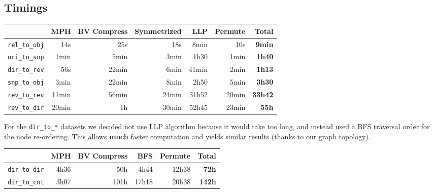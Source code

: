 \documentclass[11pt,a4paper]{article}
\begin{document}

\subsection{Timings}

\begin{center}
    \begin{tabular}{@{} l *6r @{}}
        \toprule
        \multicolumn{1}{c}{} &
            \textbf{MPH} &
            \textbf{BV Compress} &
            \textbf{Symmetrized} &
            \textbf{LLP} &
            \textbf{Permute} &
            \textbf{Total} \\
        \midrule
        \texttt{rel\_to\_obj}
            & 14s & 25s & 18s & 8min & 10s & \textbf{9min} \\
        \texttt{ori\_to\_snp}
            & 1min & 5min & 3min & 1h30 & 1min & \textbf{1h40} \\
        \texttt{dir\_to\_rev}
            & 56s & 22min & 6min & 41min & 2min & \textbf{1h13} \\
        \texttt{snp\_to\_obj}
            & 3min & 22min & 8min & 2h50 & 5min & \textbf{3h30} \\
        \texttt{rev\_to\_rev}
            & 11min & 56min & 24min & 31h52 & 20min & \textbf{33h42} \\
        \texttt{rev\_to\_dir}
            & 20min & 1h & 30min & 52h45 & 23min & \textbf{55h} \\
        \bottomrule
    \end{tabular}
\end{center}

\vspace{0.5cm}

For the \texttt{dir_to_*} datasets we decided not use LLP algorithm
because it would take too long, and instead used a BFS traversal order for the
node re-ordering. This allows \textbf{much} faster computation and yields
similar results (thanks to our graph topology).

\vspace{0.5cm}

\begin{center}
    \begin{tabular}{@{} l *5r @{}}
        \toprule
        \multicolumn{1}{c}{} &
            \textbf{MPH} &
            \textbf{BV Compress} &
            \textbf{BFS} &
            \textbf{Permute} &
            \textbf{Total} \\
        \midrule
        \texttt{dir\_to\_dir}
            & 4h36 & 50h & 4h44 & 12h38 & \textbf{72h} \\
        \texttt{dir\_to\_cnt}
            & 3h07 & 101h & 17h18 & 20h38 & \textbf{142h} \\
        \bottomrule
    \end{tabular}
\end{center}
\end{document}
